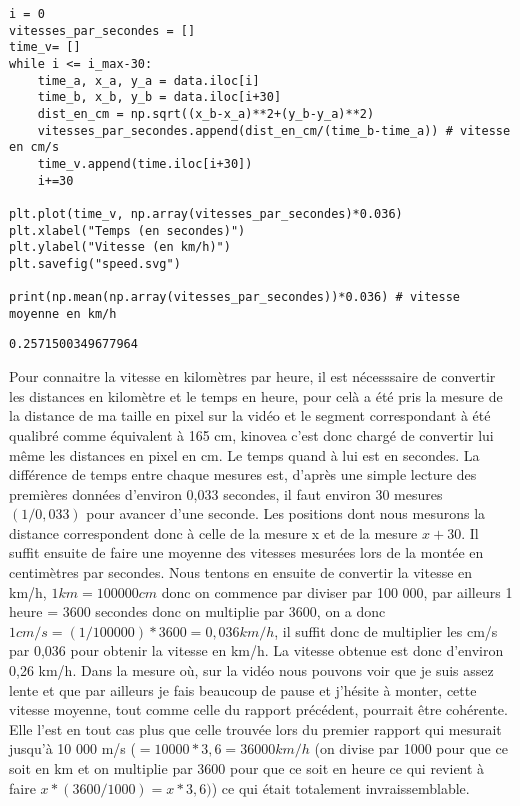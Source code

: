 \documentclass[11pt]{article}
\begin{document}
\begin{verbatim}
i = 0
vitesses_par_secondes = []
time_v= []
while i <= i_max-30:
    time_a, x_a, y_a = data.iloc[i]
    time_b, x_b, y_b = data.iloc[i+30]
    dist_en_cm = np.sqrt((x_b-x_a)**2+(y_b-y_a)**2)
    vitesses_par_secondes.append(dist_en_cm/(time_b-time_a)) # vitesse en cm/s
    time_v.append(time.iloc[i+30])
    i+=30

plt.plot(time_v, np.array(vitesses_par_secondes)*0.036)
plt.xlabel("Temps (en secondes)")
plt.ylabel("Vitesse (en km/h)")
plt.savefig("speed.svg")

print(np.mean(np.array(vitesses_par_secondes))*0.036) # vitesse moyenne en km/h
\end{verbatim}

\label{org4fb31fe}
\begin{verbatim}
0.2571500349677964
\end{verbatim}


Pour connaitre la vitesse en kilomètres par heure, il est nécesssaire de convertir les distances en kilomètre et le temps en heure, pour celà a été pris
la mesure de la distance de ma taille en pixel sur la vidéo et le segment correspondant à été qualibré comme équivalent à 165 cm, kinovea c'est donc
chargé de convertir lui même les distances en pixel en cm. Le temps quand à lui est en secondes. La différence de temps entre chaque mesures est,
d'après une simple lecture des premières données d'environ 0,033 secondes, il faut environ 30 mesures \((1/0,033)\) pour avancer d'une seconde. Les
positions dont nous mesurons la distance correspondent donc à celle de la mesure x et de la mesure \(x+30\). Il suffit ensuite de faire une moyenne
des vitesses mesurées lors de la montée en centimètres par secondes. Nous tentons en ensuite de convertir la vitesse en km/h, \(1 km = 100 000 cm\) donc on
commence par diviser par 100 000, par ailleurs 1 heure = 3600 secondes donc on multiplie par 3600, on a donc \(1 cm/s = (1/100 000)*3600 = 0,036 km/h\), il
suffit donc de multiplier les cm/s par 0,036 pour obtenir la vitesse en km/h. La vitesse obtenue est donc d'environ 0,26 km/h. Dans la mesure où, sur la
vidéo nous pouvons voir que je suis assez lente et que par ailleurs je fais beaucoup de pause et j'hésite à monter, cette vitesse moyenne, tout comme celle
du rapport précédent, pourrait être cohérente. Elle l'est en tout cas plus que celle trouvée lors du premier rapport qui mesurait jusqu'à 10 000 m/s
(\(= 10 000*3,6 = 36 000 km/h\) (on divise par 1000 pour que ce soit en km et on multiplie par 3600 pour que ce soit en heure ce qui revient à faire
\(x*(3600/1000)=x*3,6)\)) ce qui était totalement invraissemblable.
\end{document}
